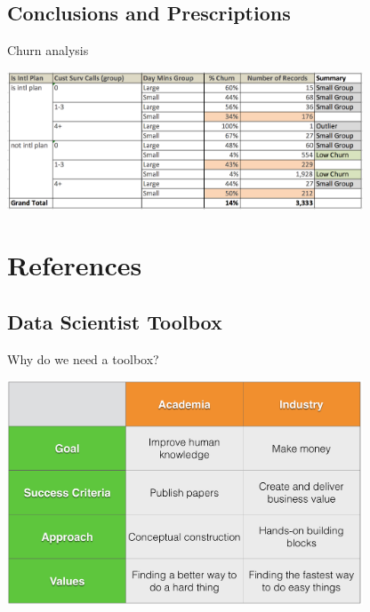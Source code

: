 \documentclass[10pt]{beamer}
\begin{document}
  \subsection{Conclusions and Prescriptions}

    \begin{frame}{Churn analysis}
      \begin{center}
        \includegraphics[width=300pt]{../graphs/churn_analysis}
      \end{center}
    \end{frame}

\section{References}

  \subsection{Data Scientist Toolbox}

    \begin{frame}{Why do we need a toolbox?}
      \begin{center}
        \includegraphics[width=300pt]{../graphs/academia_industry}
      \end{center}
    \end{frame}
\end{document}
